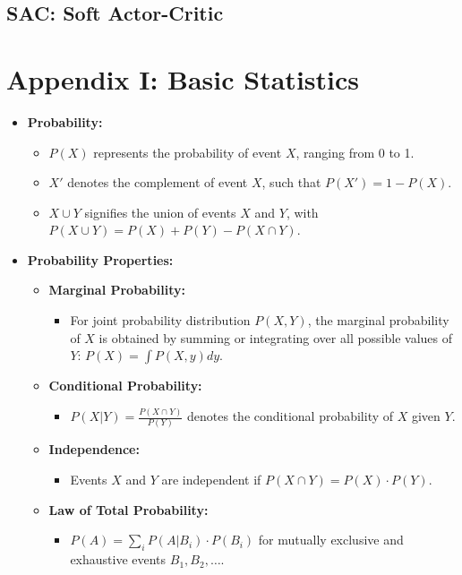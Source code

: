 \documentclass{article}
\begin{document}
\subsection{SAC: Soft Actor-Critic}






\newpage
\section{Appendix I: Basic Statistics}\label{apx:basic_statistics}

\begin{itemize}
  \item \textbf{Probability:}
  \begin{itemize}
    \item $P(X)$ represents the probability of event $X$, ranging from 0 to 1.
    \item $X'$ denotes the complement of event $X$, such that $P(X') = 1 - P(X)$.
    \item $X \cup Y$ signifies the union of events $X$ and $Y$, with $P(X \cup Y) = P(X) + P(Y) - P(X \cap Y)$.
  \end{itemize}

  \item \textbf{Probability Properties:}
  \begin{itemize}
    \item \textbf{Marginal Probability:}
    \begin{itemize}
      \item For joint probability distribution $P(X, Y)$, the marginal probability of $X$ is obtained by summing or integrating over all possible values of $Y$: $P(X) = \int P(X, y) dy$.
    \end{itemize}
    \item \textbf{Conditional Probability:}
    \begin{itemize}
      \item $P(X|Y) = \frac{P(X \cap Y)}{P(Y)}$ denotes the conditional probability of $X$ given $Y$.
    \end{itemize}
    \item \textbf{Independence:}
    \begin{itemize}
      \item Events $X$ and $Y$ are independent if $P(X \cap Y) = P(X) \cdot P(Y)$.
    \end{itemize}
    \item \textbf{Law of Total Probability:}
    \begin{itemize}
      \item $P(A) = \sum_{i} P(A|B_i) \cdot P(B_i)$ for mutually exclusive and exhaustive events $B_1, B_2, \ldots$.
    \end{itemize}
  \end{itemize}


\end{itemize}
\end{document}
